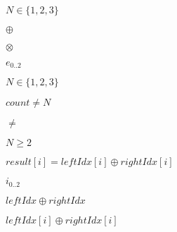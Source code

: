 \documentclass{article}
\begin{document}
$N \in \{ 1,2,3 \}$
\pagebreak

$\oplus$
\pagebreak

$\otimes$
\pagebreak

$e_{0..2}$
\pagebreak

$N \in \{1,2,3\}$
\pagebreak

$count \ne N$
\pagebreak

$\ne$
\pagebreak

$N \ge 2$
\pagebreak

$result[i] = leftIdx[i] \oplus rightIdx[i]$
\pagebreak

$i_{0..2}$
\pagebreak

$leftIdx \oplus rightIdx$
\pagebreak

$leftIdx[i] \oplus rightIdx[i]$
\pagebreak
\end{document}
